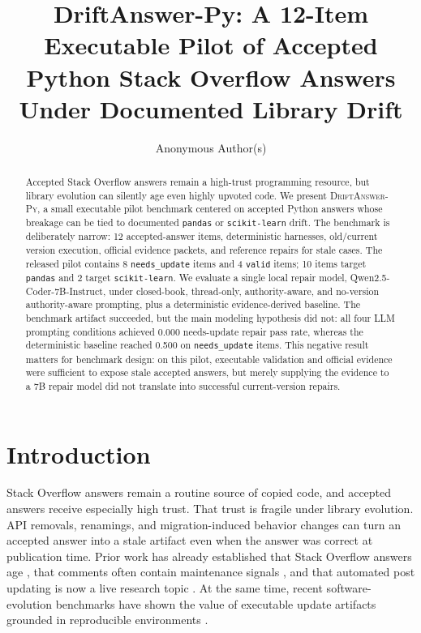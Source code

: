 \documentclass{article}
\title{DriftAnswer-Py: A 12-Item Executable Pilot of Accepted Python Stack Overflow Answers Under Documented Library Drift}
\author{Anonymous Author(s)}
\newcommand{\dataset}{\textsc{DriftAnswer-Py}}
\newcommand{\valid}{\texttt{valid}}
\newcommand{\needsupdate}{\texttt{needs\_update}}
\begin{document}
\maketitle

\begin{abstract}
Accepted Stack Overflow answers remain a high-trust programming resource, but library evolution can silently age even highly upvoted code. We present \dataset, a small executable pilot benchmark centered on accepted Python answers whose breakage can be tied to documented \texttt{pandas} or \texttt{scikit-learn} drift. The benchmark is deliberately narrow: 12 accepted-answer items, deterministic harnesses, old/current version execution, official evidence packets, and reference repairs for stale cases. The released pilot contains 8 \needsupdate{} items and 4 \valid{} items; 10 items target \texttt{pandas} and 2 target \texttt{scikit-learn}. We evaluate a single local repair model, Qwen2.5-Coder-7B-Instruct, under closed-book, thread-only, authority-aware, and no-version authority-aware prompting, plus a deterministic evidence-derived baseline. The benchmark artifact succeeded, but the main modeling hypothesis did not: all four LLM prompting conditions achieved 0.000 needs-update repair pass rate, whereas the deterministic baseline reached 0.500 on \needsupdate{} items. This negative result matters for benchmark design: on this pilot, executable validation and official evidence were sufficient to expose stale accepted answers, but merely supplying the evidence to a 7B repair model did not translate into successful current-version repairs.
\end{abstract}

\section{Introduction}

Stack Overflow answers remain a routine source of copied code, and accepted answers receive especially high trust. That trust is fragile under library evolution. API removals, renamings, and migration-induced behavior changes can turn an accepted answer into a stale artifact even when the answer was correct at publication time. Prior work has already established that Stack Overflow answers age \citep{Zhang2019}, that comments often contain maintenance signals \citep{Sheikhaei2023URC}, and that automated post updating is now a live research topic \citep{Mai2025TowardsBetterAnswers, Bappon2026}. At the same time, recent software-evolution benchmarks have shown the value of executable update artifacts grounded in reproducible environments \citep{reyes2024bump, reyes2025byam}.
\end{document}
